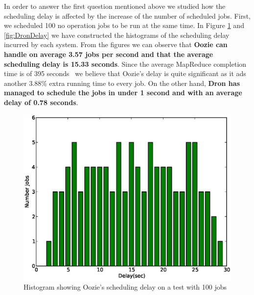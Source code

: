 \documentclass[11pt,a4paper,twoside]{report}
\begin{document}
In order to answer the first question mentioned above we studied how the scheduling delay is affected by the increase of the number of scheduled jobs. First, we scheduled 100 no operation jobs to be run at the same time. In Figure \ref{fig:OozieDelay} and \ref{fig:DronDelay} we have constructed the histograms of the scheduling delay incurred by each system. From the figures we can observe that \textbf{Oozie can handle on average 3.57 jobs per second and that the average scheduling delay is 15.33 seconds}. Since the average MapReduce completion time is of 395 seconds~\cite{ClusterFailure} we believe that Oozie's delay is quite significant as it ads another 3.88\% extra running time to every job. On the other hand, \textbf{Dron has managed to schedule the jobs in under 1 second and with an average delay of 0.78 seconds}.


\begin{figure}[h]
\centering
\includegraphics[scale=0.50]{ooziedelay}
\caption{Histogram showing Oozie's scheduling delay on a test with 100 jobs}
\label{fig:OozieDelay}
\end{figure}
\end{document}
